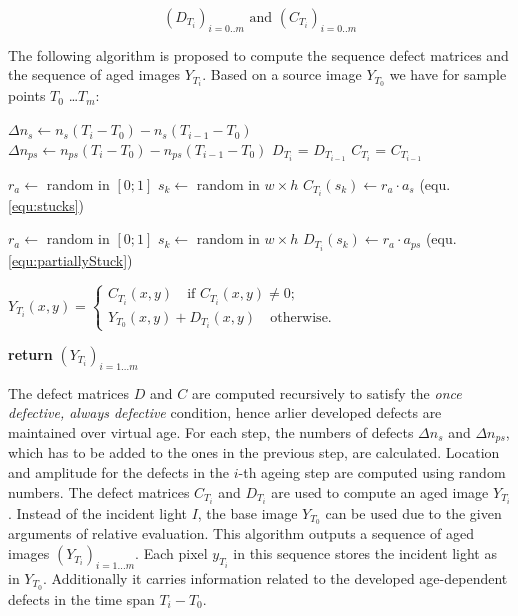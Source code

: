 \documentclass[10pt,twocolumn,letterpaper]{article}
\begin{document}
\begin{equation}
(D_{T_i})_{i=0..m} \text{ and } (C_{T_i})_{i=0..m}
\end{equation}

The following algorithm is proposed to compute the sequence defect matrices and the sequence of aged images $Y_{T_i}$. Based on a source image $Y_{T_0}$ we have for sample points $T_0$ \dots $T_m$:

\vspace{2mm}
\begin{algorithmic}[1]


\State $\Delta n_s\gets n_s(T_i - T_0) - n_s(T_{i-1} - T_0) $ 
\State $\Delta n_{ps}\gets n_{ps}(T_i - T_0) - n_{ps}(T_{i-1} - T_0) $
\State $D_{T_i}$ = $D_{T_{i-1}}$
\State $C_{T_i}$ = $C_{T_{i-1}}$

    \State $r_a \gets$ random in $[0;1]$
    \State $s_k \gets$ random in $w \times h$
    \State $C_{T_{i}}(s_k) \gets r_a \cdot a_s$ (equ. \ref{equ:stucks})
  \EndFor
  
    \State $r_a \gets$ random in $[0;1]$ 
    \State $s_k \gets$ random in $w \times h$
    \State $D_{T_i}({s_k}) \gets r_a \cdot a_{ps}$ (equ. \ref{equ:partiallyStuck})
  \EndFor
  
  
  $Y_{T_{i}}(x,y) = \begin{cases}
  C_{T_i}(x,y) \quad \text{if $C_{T_i}(x,y) \neq 0$}; \\
  Y_{T_{0}}(x,y) +D_{T_i}(x,y)  \quad \text{otherwise}.
  \end{cases}$
  
\EndFor
\State \textbf{return} $(Y_{T_i})_{i=1 \dots m}$
\EndProcedure
\end{algorithmic}

\vspace{5mm}


The defect matrices $D$ and $C$ are computed recursively to satisfy the \emph{once defective, always defective} condition, hence arlier developed defects are maintained over virtual age. For each step, the numbers of defects $\Delta n_s$ and $\Delta n_{ps}$, which has to be added to the ones in the previous step, are calculated. Location and amplitude for the defects in the $i$-th ageing step are computed using random numbers. The defect matrices $C_{T_i}$ and $D_{T_i}$ are used to compute an aged image $Y_{T_i}$. Instead of the incident light $I$, the base image $Y_{T_0}$ can be used due to the given arguments of relative evaluation. This algorithm outputs a sequence of aged images $(Y_{T_i})_{i=1 \dots m}$. Each pixel $y_{T_i}$ in this sequence stores the incident light as in $Y_{T_0}$. Additionally it carries information related to the developed age-dependent defects in the time span $T_i-T_0$.
 
\end{document}
